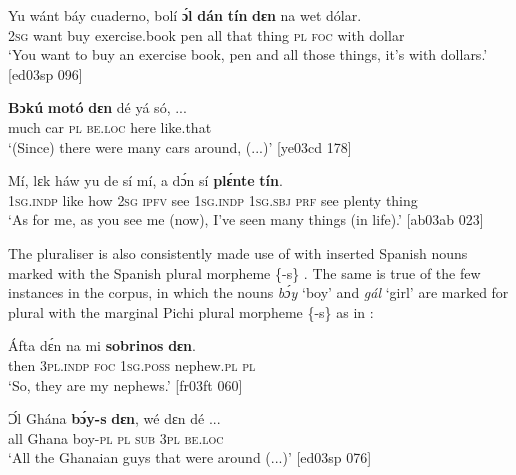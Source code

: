 \ea%
    \label{ex:key:213}
    \gll Yu  wánt  báy  cuaderno,    bolí  \textbf{ɔ́l}  \textbf{dán}  \textbf{tín}    \textbf{dɛn}
na  wet    dólar.\\
\textsc{2sg}  want  buy  exercise.book    pen  all  that  thing  \textsc{pl}
\textsc{foc}  with    dollar\\

\glt ‘You want to buy an exercise book, pen and all those things, it’s with dollars.’ [ed03sp 096] 
\z


\ea%
    \label{ex:key:214}
    \gll \textbf{Bɔkú}  \textbf{ motó} \textbf{  dɛn} dé    yá    só,    \op...\cp\\
much  car    \textsc{pl}  \textsc{be.loc}  here    like.that\\

\glt ‘(Since) there were many cars around, (...)’ [ye03cd 178]
\z


\ea%
    \label{ex:key:215}
    \gll Mí,    lɛk  háw  yu  de  sí  mí,    a    dɔ́n  
sí  \textbf{plɛ́nte}  \textbf{tín}.\\
\textsc{1sg.indp}  like  how  \textsc{2sg}  \textsc{ipfv}  see  \textsc{1sg.indp}  \textsc{1sg.sbj}  \textsc{prf}  
see  plenty  thing \\

\glt ‘As for me, as you see me (now), I’ve seen many things (in life).’ [ab03ab 023]
\z

The pluraliser is also consistently made use of with inserted Spanish nouns marked with the Spanish plural morpheme \{-s\} . The same is true of the few instances in the corpus, in which the nouns \textit{bɔ́y} ‘boy’ and \textit{gál} ‘girl’ are marked for plural with the marginal Pichi plural morpheme \{-s\} as in :


\ea%
    \label{ex:key:216}
    \gll \'{A}fta    dɛ́n    na  mi    \textbf{sobrinos}    \textbf{dɛn}.\\
then  \textsc{3pl.indp}  \textsc{foc}  \textsc{1sg.poss}  nephew.\textsc{pl}  \textsc{pl}\\

\glt ‘So, they are my nephews.’ [fr03ft 060]
\z


\ea%
    \label{ex:key:217}
    \gll Ɔ́l  Ghána  \textbf{bɔ́y-s}  \textbf{dɛn},    wé  dɛn  dé  \op...\cp\\
all  Ghana  boy-\textsc{pl}  \textsc{pl}    \textsc{sub}  \textsc{3pl}  \textsc{be.loc}\\

\glt ‘All the Ghanaian guys that were around (...)’ [ed03sp 076]
\z

